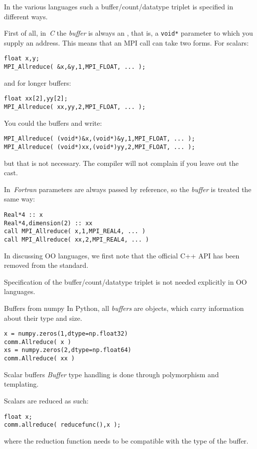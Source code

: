 In the various languages such a buffer/count/datatype triplet is specified in
different ways.

First of all, in~\emph{C} the
\emph{buffer}
is always an , that is,
a \lstinline+void*+ parameter to which you supply an address.
This means that an MPI call can take two forms.
For scalars:
\begin{lstlisting}
float x,y;
MPI_Allreduce( &x,&y,1,MPI_FLOAT, ... );
\end{lstlisting}
and for longer buffers:
\begin{lstlisting}
float xx[2],yy[2];
MPI_Allreduce( xx,yy,2,MPI_FLOAT, ... );
\end{lstlisting}
You could  the buffers and write:
\begin{lstlisting}
MPI_Allreduce( (void*)&x,(void*)&y,1,MPI_FLOAT, ... );
MPI_Allreduce( (void*)xx,(void*)yy,2,MPI_FLOAT, ... );
\end{lstlisting}
but that is not necessary. The compiler will not complain
if you leave out the cast.

\begin{fortrannote}
  In~\emph{Fortran} parameters are always passed by reference,
  so the \emph{buffer}
  is treated the same way:
\begin{lstlisting}
Real*4 :: x
Real*4,dimension(2) :: xx
call MPI_Allreduce( x,1,MPI_REAL4, ... )
call MPI_Allreduce( xx,2,MPI_REAL4, ... )
\end{lstlisting}
\end{fortrannote}

In discussing \ac{OO} languages, we first note that
the official C++ \ac{API} has been removed from the standard.

Specification of the buffer/count/datatype triplet is not
needed explicitly in \ac{OO} languages.

\begin{pythonnote}{Buffers from numpy}
  In Python, all \emph{buffers}
  are  objects, which carry information about their type and size.
\begin{lstlisting}
x = numpy.zeros(1,dtype=np.float32)
comm.Allreduce( x )
xs = numpy.zeros(2,dtype=np.float64)
comm.Allreduce( xx )
\end{lstlisting}
\end{pythonnote}

\begin{mplnote}{Scalar buffers}
  \emph{Buffer} type handling
  is done through polymorphism and templating.

  Scalars are reduced as such:
\begin{lstlisting}
float x;
comm.allreduce( reducefunc(),x );
\end{lstlisting}
where the reduction function needs to be compatible with the type of the buffer.
\end{mplnote}

